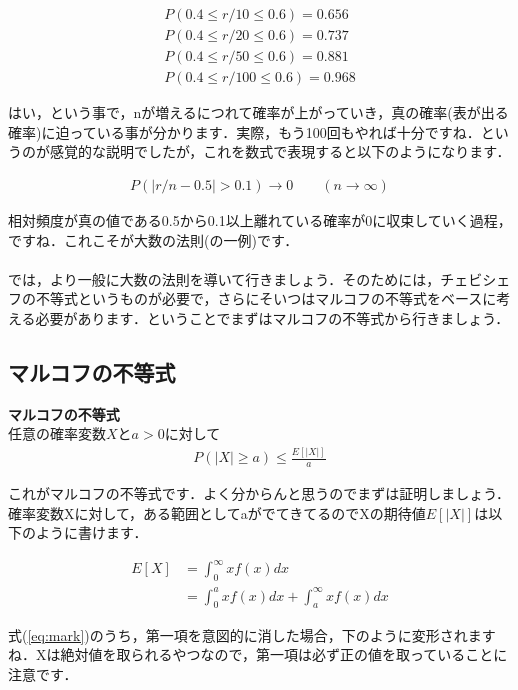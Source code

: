 \documentclass[11pt,a4paper,uplatex]{ujreport} 	%
\begin{document}
\begin{align}
  P(0.4 \leq r/10 \leq 0.6) = 0.656\\
  P(0.4 \leq r/20 \leq 0.6) = 0.737\\
  P(0.4 \leq r/50 \leq 0.6) = 0.881\\
  P(0.4 \leq r/100 \leq 0.6) = 0.968
\end{align}

はい，という事で，nが増えるにつれて確率が上がっていき，真の確率(表が出る確率)に迫っている事が分かります．実際，もう100回もやれば十分ですね．というのが感覚的な説明でしたが，これを数式で表現すると以下のようになります．

\begin{align}
  P(|r/n -0.5| > 0.1) \longrightarrow 0\qquad(n\rightarrow\infty)
\end{align}

相対頻度が真の値である0.5から0.1以上離れている確率が0に収束していく過程，ですね．これこそが大数の法則(の一例)です．\\\\

では，より一般に大数の法則を導いて行きましょう．そのためには，チェビシェフの不等式というものが必要で，さらにそいつはマルコフの不等式をベースに考える必要があります．ということでまずはマルコフの不等式から行きましょう．

\subsection{マルコフの不等式}

\begin{screen}
  \textbf{マルコフの不等式}\\
  任意の確率変数$X$と$a>0$に対して
  \begin{align}
    P(|X| \geq a) \leq \frac{E[|X|]}{a}
  \end{align}
\end{screen}

これがマルコフの不等式です．よく分からんと思うのでまずは証明しましょう．確率変数Xに対して，ある範囲としてaがでてきてるのでXの期待値$E[|X|]$は以下のように書けます．

\begin{align}
  E[X] &= \int_0^\infty xf(x)dx \nonumber \\
  &= \int_0^a xf(x)dx + \int_a^\infty x f(x)dx
  \label{eq:mark}
\end{align}

式(\ref{eq:mark})のうち，第一項を意図的に消した場合，下のように変形されますね．Xは絶対値を取られるやつなので，第一項は必ず正の値を取っていることに注意です．
\end{document}

